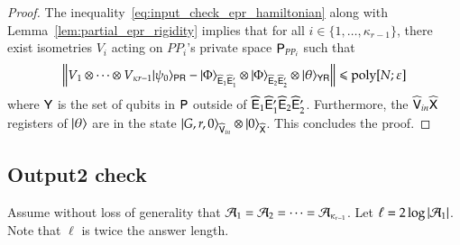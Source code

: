\begin{proof}
The inequality~\eqref{eq:input_check_epr_hamiltonian} along with Lemma~\ref{lem:partial_epr_rigidity} implies that for all $i \in \{1,\ldots,\kappa_{r-1}\}$, there exist isometries $V_i$ acting on $PP_i$'s private space ${\mathsf{P}}_{PP_i}$ such that 
\[
	\left\lVert V_1 \otimes \cdots \otimes V_{\kappa{r-1}} |\psi_0\rangle_{{\mathsf{P}} {\mathsf{R}}} - |\Phi\rangle_{\widehat{{\mathsf{E}}}_1 \widehat{{\mathsf{E}}}_1'} \otimes |\Phi\rangle_{\widehat{{\mathsf{E}}}_2 \widehat{{\mathsf{E}}}_2'} \otimes |\theta\rangle_{{\mathsf{Y}} {\mathsf{R}}}\right\rVert \leqslant \operatorname{poly}[N;\varepsilon]
\]
where ${\mathsf{Y}}$ is the set of qubits in ${\mathsf{P}}$ outside of $\widehat{{\mathsf{E}}}_1 \widehat{{\mathsf{E}}}_1' \widehat{{\mathsf{E}}}_2 \widehat{{\mathsf{E}}}_2'$. Furthermore, the $\widehat{{\mathsf{V}}}_{in} \widehat{{\mathsf{X}}}$ registers of $|\theta\rangle$ are in the state $|G,r,0\rangle_{\widehat{{\mathsf{V}}}_{in}} \otimes |0\rangle_{\widehat{{\mathsf{X}}}}$. This concludes the proof.
	
%	
%	
	
\end{proof}

\subsection{Output2 check}
\label{sec:output_check}


Assume without loss of generality that $\mathcal A_1 = \mathcal A_2 = \cdots = \mathcal A_{\kappa_{r-1}}$. Let $\ell = 2 \log |\mathcal A_1|$.  Note that $\ell$ is twice the answer length.

